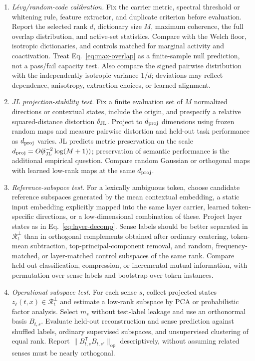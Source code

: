 \documentclass[
  aps,
  reprint,
  superscriptaddress,
  floatfix,
  nofootinbib,
  longbibliography
]{revtex4-2}
\newcommand{\Msem}{M}
\newcommand{\T}{^{\mathsf{T}}}
\newcommand{\opnorm}[1]{\lVert #1 \rVert_{\mathrm{op}}}
\begin{document}
\begin{enumerate}
\item \emph{L\'evy/random-code calibration.}
Fix the carrier metric, spectral threshold or whitening rule, feature extractor,
and duplicate criterion before evaluation.  Report the selected rank $d$,
dictionary size $\Msem$, maximum coherence, the full overlap distribution, and
active-set statistics.  Compare with the Welch floor, isotropic dictionaries,
and controls matched for marginal activity and coactivation.  Treat
Eq.~\eqref{eq:max-overlap} as a finite-sample null prediction, not a pass/fail
capacity test.  Also compare the signed pairwise distribution with the
independently isotropic variance $1/d$; deviations may reflect dependence,
anisotropy, extraction choices, or learned alignment.

\item \emph{JL projection-stability test.}
Fix a finite evaluation set of $\Msem$ normalized directions or contextual
states, include the origin, and prespecify a relative squared-distance
distortion $\delta_{\rm JL}$.  Project to $d_{\rm proj}$ dimensions using
frozen random maps and measure pairwise distortion and held-out task
performance as $d_{\rm proj}$ varies.  JL predicts metric preservation on the
scale $d_{\rm proj}=O(\!\delta_{\rm JL}^{-2}\log(\Msem+1))$; preservation of
semantic performance is the additional empirical question.  Compare random
Gaussian or orthogonal maps with learned low-rank maps at the same
$d_{\rm proj}$.

\item \emph{Reference-subspace test.}
For a lexically ambiguous token, choose candidate reference subspaces generated
by the mean contextual embedding, a static input embedding explicitly mapped
into the same layer carrier,
learned token-specific directions, or a low-dimensional combination of
these. Project layer states as in Eq.~\eqref{eq:layer-decomp}. Sense labels
should be better separated in $\mathcal R_t^\perp$ than in orthogonal
complements obtained after ordinary centering, token-mean subtraction,
top-principal-component removal, and random, frequency-matched, or
layer-matched control subspaces of the same rank.  Compare held-out
classification, compression, or incremental mutual information, with
permutation over sense labels and bootstrap over token instances.

\item \emph{Operational subspace test.}
For each sense $s$, collect projected states
$z_\ell(t,x)\in\mathcal R_t^\perp$ and estimate a low-rank subspace by PCA or
probabilistic factor analysis. Select $m_s$ without test-label leakage and use
an orthonormal basis $B_{t,s}$.  Evaluate held-out reconstruction and sense
prediction against shuffled labels, ordinary supervised subspaces, and
unsupervised clustering of equal rank.  Report
$\opnorm{B_{t,s}\T B_{t,s'}}$ descriptively, without assuming related senses
must be nearly orthogonal.


\end{enumerate}
\end{document}
